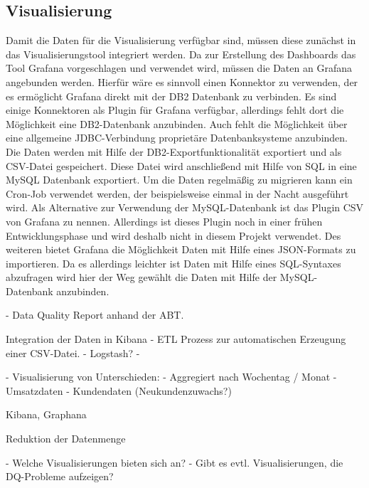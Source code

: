 


\subsection{Visualisierung}
Damit die Daten für die Visualisierung verfügbar sind, müssen diese zunächst in das Visualisierungstool integriert werden. 
Da zur Erstellung des Dashboards das Tool Grafana vorgeschlagen und verwendet wird, müssen die Daten an Grafana angebunden werden.
Hierfür wäre es sinnvoll einen Konnektor zu verwenden, der es ermöglicht Grafana direkt mit der DB2 Datenbank zu verbinden. 
Es sind einige Konnektoren als Plugin für Grafana verfügbar, allerdings fehlt dort die Möglichkeit eine DB2-Datenbank anzubinden. \cite{https://grafana.com/grafana/plugins?type=datasource}
Auch fehlt die Möglichkeit über eine allgemeine JDBC-Verbindung proprietäre Datenbanksysteme anzubinden. 
Die Daten werden mit Hilfe der DB2-Exportfunktionalität exportiert und als CSV-Datei gespeichert. 
Diese Datei wird anschließend mit Hilfe von SQL in eine MySQL Datenbank exportiert. 
Um die Daten regelmäßig zu migrieren kann ein Cron-Job verwendet werden, der beispielsweise einmal in der Nacht ausgeführt wird. 
Als Alternative zur Verwendung der MySQL-Datenbank ist das Plugin CSV von Grafana zu nennen. 
Allerdings ist dieses Plugin noch in einer frühen Entwicklungsphase und wird deshalb nicht in diesem Projekt verwendet. \cite{https://grafana.com/grafana/plugins/marcusolsson-csv-datasource?pg=plugins&plcmt=featured-undefined}
Des weiteren bietet Grafana die Möglichkeit Daten mit Hilfe eines JSON-Formats zu importieren. 
Da es allerdings leichter ist Daten mit Hilfe eines SQL-Syntaxes abzufragen wird hier der Weg gewählt die Daten mit Hilfe der MySQL-Datenbank anzubinden.


- Data Quality Report anhand der ABT.


Integration der Daten in Kibana
- ETL Prozess zur automatischen Erzeugung einer CSV-Datei.
- Logstash?
- 

- Visualisierung von Unterschieden:
- Aggregiert nach Wochentag / Monat
- Umsatzdaten
- Kundendaten (Neukundenzuwachs?)


Kibana, Graphana

Reduktion der Datenmenge



- Welche Visualisierungen bieten sich an?
- Gibt es evtl. Visualisierungen, die DQ-Probleme aufzeigen?


